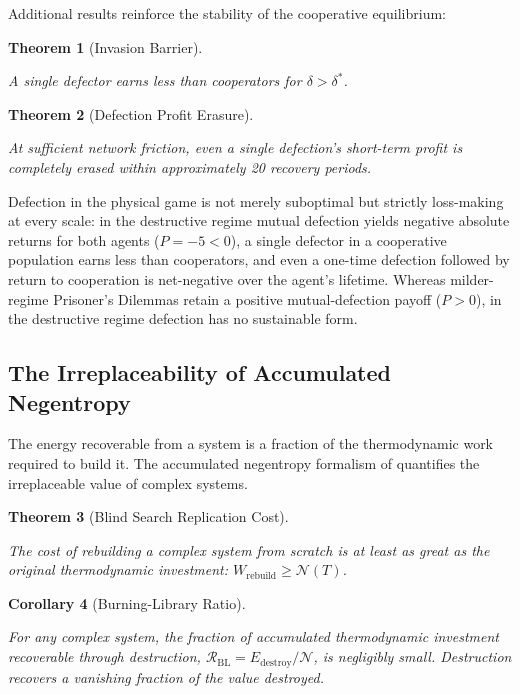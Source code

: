 \documentclass[11pt]{article}
\theoremstyle{plain}
\newtheorem{theorem}{Theorem}
\newtheorem{corollary}[theorem]{Corollary}
\theoremstyle{definition}
\theoremstyle{remark}
\let\origsubsection\subsection
\renewcommand{\subsection}{\needspace{7\baselineskip}\origsubsection}
\begin{document}
Additional results reinforce the stability of the cooperative
equilibrium:

\begin{theorem}[Invasion Barrier]
\label{ethics-thm-invasion-barrier}

A single defector earns less than cooperators for $\delta > \delta^*$. \citep{TC-V}
\end{theorem}

\begin{theorem}[Defection Profit Erasure]
\label{ethics-thm-profit-erasure}

At sufficient network friction, even a single defection's short-term profit is completely erased within approximately 20 recovery periods. \citep{TC-V}
\end{theorem}

Defection in the physical game is not merely suboptimal but strictly
loss-making at every scale: in the destructive regime mutual defection
yields negative absolute returns for both agents (\(P = -5 < 0\)), a
single defector in a cooperative population earns less than cooperators,
and even a one-time defection followed by return to cooperation is
net-negative over the agent's lifetime. Whereas milder-regime Prisoner's
Dilemmas retain a positive mutual-defection payoff (\(P > 0\)), in the
destructive regime defection has no sustainable form.

\subsection{The Irreplaceability of Accumulated
Negentropy}\label{the-irreplaceability-of-accumulated-negentropy}

The energy recoverable from a system is a fraction of the thermodynamic
work required to build it. The accumulated negentropy formalism of
\citep{TC-III} quantifies the irreplaceable value of complex systems.

\begin{theorem}[Blind Search Replication Cost]
\label{ethics-thm-replication-cost}

The cost of rebuilding a complex system from scratch is at least as great as the original thermodynamic investment: $W_{\text{rebuild}} \geq \mathcal{N}(T)$. \citep{TC-III}
\end{theorem}

\begin{corollary}[Burning-Library Ratio]
\label{ethics-cor-burning-library}

For any complex system, the fraction of accumulated thermodynamic investment recoverable through destruction, $\mathcal{R}_{\text{BL}} = E_{\text{destroy}} / \mathcal{N}$, is negligibly small. Destruction recovers a vanishing fraction of the value destroyed. \citep{TC-III}
\end{corollary}
\end{document}
